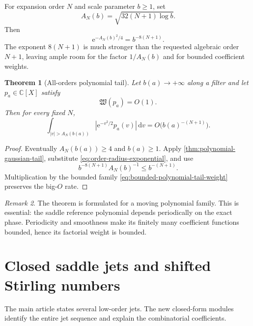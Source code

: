 \documentclass[11pt,oneside]{article}
\newtheorem{theorem}{Theorem}[section]
\theoremstyle{definition}
\theoremstyle{remark}
\newtheorem{remark}[theorem]{Remark}
\newcommand{\C}{\mathbb C}
\newcommand{\e}{\mathrm e}
\newcommand{\dd}{\,\mathrm d}
\begin{document}
For expansion order $N$ and scale parameter $b\ge1$, set
\begin{equation}
 A_N(b)=\sqrt{32(N+1)\log b}.
 \label{eq:order-central-radius}
\end{equation}
Then
\begin{equation}
 \e^{-A_N(b)^2/4}=b^{-8(N+1)}.
 \label{eq:order-radius-exponential}
\end{equation}
The exponent $8(N+1)$ is much stronger than the requested algebraic order $N+1$, leaving
ample room for the factor $1/A_N(b)$ and for bounded coefficient weights.

\begin{theorem}[All-orders polynomial tail]
\label{thm:all-orders-polynomial-tail}
Let $b(a)\to+\infty$ along a filter and let $p_a\in\C[X]$ satisfy
\begin{equation}
 \mathfrak W(p_a)=O(1).
 \label{eq:bounded-polynomial-tail-weight}
\end{equation}
Then for every fixed $N$,
\begin{equation}
 \int_{|v|>A_N(b(a))}
 \left|\e^{-v^2/2}p_a(v)\right|\dd v
 =O\bigl(b(a)^{-(N+1)}\bigr).
 \label{eq:all-orders-polynomial-tail}
\end{equation}
\end{theorem}

\begin{proof}
Eventually $A_N(b(a))\ge4$ and $b(a)\ge1$.  Apply
\cref{thm:polynomial-gaussian-tail}, substitute
\eqref{eq:order-radius-exponential}, and use
\[
 b^{-8(N+1)}A_N(b)^{-1}\le b^{-(N+1)}.
\]
Multiplication by the bounded family \eqref{eq:bounded-polynomial-tail-weight} preserves the
big-$O$ rate.
\end{proof}

\begin{remark}
The theorem is formulated for a moving polynomial family.  This is essential: the saddle
reference polynomial depends periodically on the exact phase.  Periodicity and smoothness
make its finitely many coefficient functions bounded, hence its factorial weight is bounded.
\end{remark}

\section{Closed saddle jets and shifted Stirling numbers}
\label{sec:saddle-jets}

The main article states several low-order jets.  The new closed-form modules identify the
entire jet sequence and explain the combinatorial coefficients.
\end{document}
